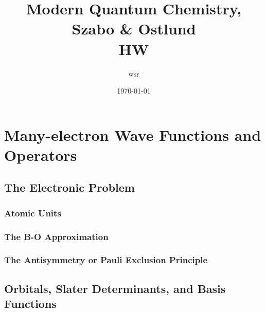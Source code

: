 \documentclass[a4paper]{article}
\title{\textbf{Modern Quantum Chemistry, Szabo \& Ostlund}\\HW}
\author{wsr
\vspace{5pt}\\
}
\date{\today} %
\numberwithin{equation}{subsection}
\begin{document}

\maketitle

\tableofcontents

\newpage

\setcounter{section}{1}
\section{Many-electron Wave Functions and Operators}
\subsection{The Electronic Problem}
\subsubsection{Atomic Units}
\subsubsection{The B-O Approximation}
\subsubsection{The Antisymmetry or Pauli Exclusion Principle}
\subsection{Orbitals, Slater Determinants, and Basis Functions}
\end{document}
